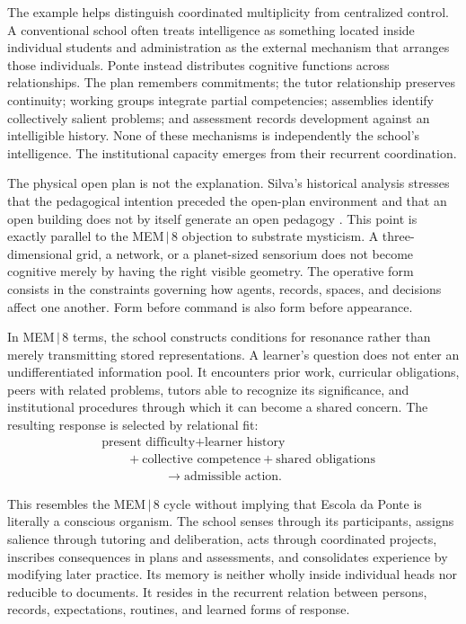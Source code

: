 \documentclass[11pt]{article}
\begin{document}
The example helps distinguish coordinated multiplicity from centralized control. A conventional school often treats intelligence as something located inside individual students and administration as the external mechanism that arranges those individuals. Ponte instead distributes cognitive functions across relationships. The plan remembers commitments; the tutor relationship preserves continuity; working groups integrate partial competencies; assemblies identify collectively salient problems; and assessment records development against an intelligible history. None of these mechanisms is independently the school's intelligence. The institutional capacity emerges from their recurrent coordination.

The physical open plan is not the explanation. Silva's historical analysis stresses that the pedagogical intention preceded the open-plan environment and that an open building does not by itself generate an open pedagogy \cite{silva2020}. This point is exactly parallel to the MEM\,$|$\,8 objection to substrate mysticism. A three-dimensional grid, a network, or a planet-sized sensorium does not become cognitive merely by having the right visible geometry. The operative form consists in the constraints governing how agents, records, spaces, and decisions affect one another. Form before command is also form before appearance.

In MEM\,$|$\,8 terms, the school constructs conditions for resonance rather than merely transmitting stored representations. A learner's question does not enter an undifferentiated information pool. It encounters prior work, curricular obligations, peers with related problems, tutors able to recognize its significance, and institutional procedures through which it can become a shared concern. The resulting response is selected by relational fit:
\[
\begin{aligned}
&\text{present difficulty}+\text{learner history} \\
&\qquad +\text{collective competence}+\text{shared obligations} \\
&\hspace{5em}\longrightarrow \text{admissible action}.
\end{aligned}
\]

This resembles the MEM\,$|$\,8 cycle without implying that Escola da Ponte is literally a conscious organism. The school senses through its participants, assigns salience through tutoring and deliberation, acts through coordinated projects, inscribes consequences in plans and assessments, and consolidates experience by modifying later practice. Its memory is neither wholly inside individual heads nor reducible to documents. It resides in the recurrent relation between persons, records, expectations, routines, and learned forms of response.
\end{document}
